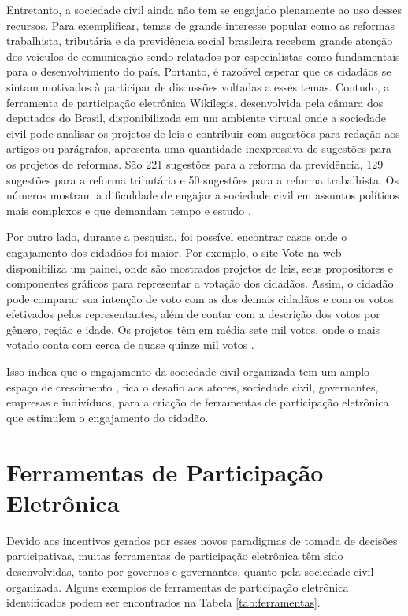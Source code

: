 \par
Entretanto, a sociedade civil ainda não tem se engajado plenamente ao uso desses recursos. Para exemplificar, temas de grande interesse popular 
como as reformas trabalhista, tributária e da previdência social brasileira recebem grande atenção dos veículos de comunicação sendo relatados por especialistas como fundamentais 
para o desenvolvimento do país. Portanto, é razoável esperar que os cidadãos se sintam motivados à participar de discussões voltadas a esses temas. 
Contudo, a ferramenta de participação eletrônica Wikilegis, desenvolvida pela câmara dos deputados do Brasil, disponibilizada em um ambiente virtual onde a sociedade civil pode analisar
 os projetos de leis e contribuir com sugestões para redação aos artigos ou parágrafos, apresenta uma quantidade inexpressiva de sugestões para os projetos de reformas. 
 São 221 sugestões para a reforma da previdência, 129 sugestões para a reforma tributária e  50 sugestões para a reforma trabalhista.  Os números mostram a dificuldade de engajar 
 a sociedade civil em assuntos políticos mais complexos e que demandam tempo e estudo \cite{wikilegis}. 

\par
Por outro lado, durante a pesquisa, foi possível encontrar casos onde o engajamento dos cidadãos foi maior. Por exemplo, o site Vote na web disponibiliza um painel, onde são mostrados projetos de leis, 
seus propositores e componentes gráficos para representar a votação dos cidadãos.
Assim, o cidadão pode comparar sua intenção de voto com as dos demais cidadãos e com os votos efetivados pelos representantes, além de contar com a descrição dos votos por gênero,
região e idade. Os projetos têm em média sete mil votos, onde o mais votado conta com cerca de quase quinze mil votos \cite{votenaweb}.

\par
Isso indica que o engajamento da sociedade civil organizada tem um amplo espaço de crescimento \cite{o2011government}, fica o desafio aos atores, sociedade civil, governantes, 
empresas e indivíduos, para a criação de ferramentas de participação eletrônica que estimulem o engajamento do cidadão.

\section{Ferramentas de Participação Eletrônica}
\label{sec:e-part tools}
Devido aos incentivos gerados por esses novos paradigmas de tomada de decisões participativas, muitas ferramentas de participação eletrônica têm sido desenvolvidas,
tanto por governos e governantes, quanto pela sociedade civil organizada. Alguns exemplos de ferramentas de participação eletrônica identificados podem ser encontrados na Tabela \ref{tab:ferramentas}.

